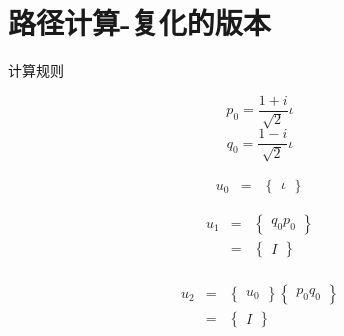 \documentclass[a4paper,12pt]{article}
\numberwithin{definition}{section}
\numberwithin{lemma}{section}
\numberwithin{proposition}{section}
\numberwithin{theorem}{section}
\numberwithin{grammar}{section}
\numberwithin{program}{section}
\numberwithin{convention}{section}
\numberwithin{corollary}{section}
\numberwithin{principle}{section}
\begin{document}
\newpage

\section{路径计算-复化的版本}

计算规则

$$p_0 = \frac{1 + i}{\sqrt{2}} \iota$$
$$q_0 = \frac{1 - i}{\sqrt{2}} \iota$$

$$\begin{array}{lcl}
u_0 & = & \begin{Bmatrix} \iota \end{Bmatrix}
\end{array}$$

$$\begin{array}{lcl}
u_1 & = & \begin{Bmatrix} q_0 p_0 \end{Bmatrix} \\
    & = & \begin{Bmatrix} I \end{Bmatrix} \\
\end{array}$$

$$\begin{array}{lcl}
u_2 & = & \begin{Bmatrix} u_0 \end{Bmatrix} \begin{Bmatrix} p_0 q_0 \end{Bmatrix} \\
    & = & \begin{Bmatrix} I \end{Bmatrix} \\
\end{array}$$
\end{document}
